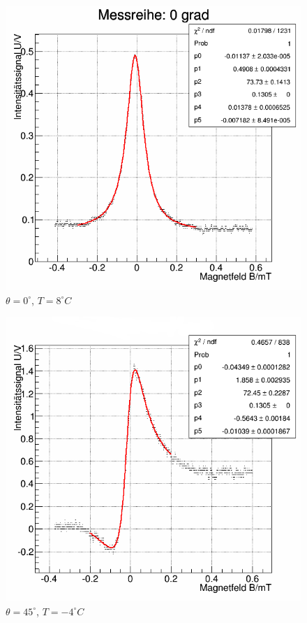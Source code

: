 \begin{figure}[h]
\begin{center}
\includegraphics[scale=0.3]{Bilder/0_8}
\caption{$\theta=0^{\circ}$, $T=8^{\circ}C$}
\end{center}
\end{figure}
\clearpage
\begin{figure}[h]
\begin{center}
\includegraphics[scale=0.3]{Bilder/45_m4}
\caption{$\theta=45^{\circ}$, $T=-4^{\circ}C$}
\end{center}
\end{figure}
